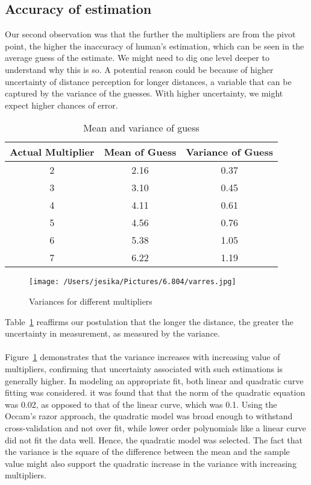 \documentclass[12pt]{article}
\begin{document}
\subsection{Accuracy of estimation}
Our second observation was that the further the multipliers are from the pivot point, the higher the inaccuracy of human's estimation, which can be seen in the average guess of the estimate. We might need to dig one level deeper to understand why this is so. A potential reason could be because of higher uncertainty of distance perception for longer distances, a variable that can be captured by the variance of the guesses. With higher uncertainty, we might expect higher chances of error. 
\begin{table}[ht]
\caption{Mean and variance of guess} %
\centering  %
\begin{tabular}{c c c} %
\hline\hline                        %
Actual Multiplier & Mean of Guess  & Variance of Guess \\ [0.5ex] %
\hline                  %
2 & 2.16 & 0.37  \\ %
3 & 3.10 & 0.45\\
4 & 4.11 & 0.61\\
5 & 4.56 & 0.76\\
6 & 5.38 & 1.05 \\ 
7 & 6.22 & 1.19 \\ [1ex]      %
\hline %
\end{tabular}
\label{mvg} %
\end{table}

\begin{figure}[!ht]
  \centering
    \texttt{[image: /Users/jesika/Pictures/6.804/varres.jpg]}
  \caption{Variances for different multipliers}
  \label{varres}
\end{figure} 
Table~\ref{mvg} reaffirms our postulation that the longer the distance, the greater the uncertainty in measurement, as measured by the variance. 
\\\\Figure~\ref{varres} demonstrates that the variance increases with increasing value of multipliers, confirming that uncertainty associated with such estimations is generally higher. In modeling an appropriate fit, both linear and quadratic curve fitting was considered. it was found that that the norm of the quadratic equation was 0.02, as opposed to that of the linear curve, which was 0.1. Using the Occam's razor approach, the quadratic model was broad enough to withstand cross-validation and not over fit, while lower order polynomials like a linear curve did not fit the data well. Hence, the quadratic model was selected. The fact that the variance is the square of the difference between the mean and the sample value might also support the quadratic increase in the variance with increasing multipliers. 
\end{document}
